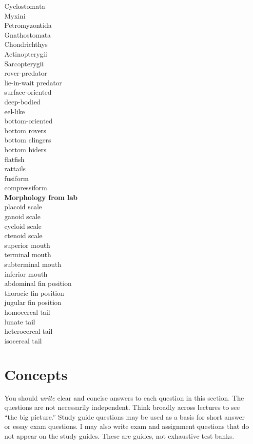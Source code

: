 \documentclass[nofonts, letterpaper]{tufte-handout}
\begin{document}
\begin{multicols}{2}
Cyclostomata\\
Myxini \\
Petromyzontida \\
Gnathostomata \\
Chondrichthys\\
Actinopterygii\\
Sarcopterygii\\
rover-predator \\
lie-in-wait predator \\
surface-oriented \\
deep-bodied \\
eel-like \\
bottom-oriented \\
bottom rovers \\
bottom clingers \\
bottom hiders \\
flatfish \\
rattails \\
fusiform \\
compressiform  \\
\columnbreak\textbf{Morphology from lab} \\
placoid scale \\
ganoid scale \\
cycloid scale \\
ctenoid scale \\
superior mouth  \\
terminal mouth  \\
subterminal mouth  \\
inferior mouth  \\
abdominal fin position \\
thoracic fin position \\
jugular fin position \\
homocercal tail \\
lunate tail \\
heterocercal tail \\
isocercal tail 
\end{multicols}

\section{Concepts}

You should \emph{write} clear and concise answers to each question in this section.  The questions are not necessarily independent.  Think broadly across lectures to see ``the big picture.''  Study guide questions may be used as a basis for short answer or essay exam questions. I may also write exam and assignment questions that do not appear on the study guides. These are guides, not exhaustive test banks.
\end{document}

